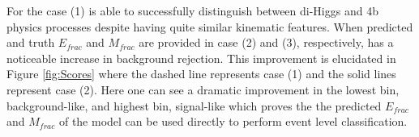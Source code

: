 For the case (1) \myname{} is able to successfully distinguish between di-Higgs and 4b physics processes despite having quite similar kinematic features. When predicted and truth $E_{frac}$ and $M_{frac}$ are provided in case (2) and (3), respectively, \myname{} has a noticeable increase in background rejection. This improvement is elucidated in Figure \ref{fig:Scores} where the dashed line represents case (1) and the solid lines represent case (2). Here one can see a dramatic improvement in the lowest bin, background-like, and highest bin, signal-like which proves the the predicted $E_{frac}$ and $M_{frac}$ of the model can be used directly to perform event level classification.

